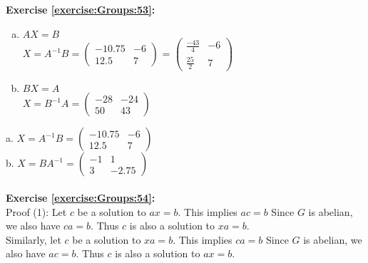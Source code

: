 \noindent\textbf{Exercise \ref{exercise:Groups:53}:}
%
\begin{enumerate}[(a)]
\item
$AX=B$\\
$X=A^{-1}B=\begin{pmatrix}
-10.75 & -6\\
12.5 & 7
\end{pmatrix}$ = $\begin{pmatrix}
\frac{-43}{4} & -6\\
\frac{25}{2} & 7
\end{pmatrix}$\\


\item
$BX=A$\\
$X=B^{-1}A=\begin{pmatrix}
-28 & -24\\
50 & 43
\end{pmatrix}$\\
\end{enumerate}
a. $X=A^{-1}B=\begin{pmatrix}
-10.75 & -6\\
12.5 & 7
\end{pmatrix}$\\
b. $X=BA^{-1}=\begin{pmatrix}
-1 & 1\\
3 & -2.75
\end{pmatrix}$\\
\\

\noindent\textbf{Exercise \ref{exercise:Groups:54}:}
\\
\noindent Proof (1):
Let $c$ be a solution to $ax=b$.  This implies $ac=b$ Since $G$ is abelian, we also have $ca=b$. Thus $c$ is also a solution to $xa=b$.\\
Similarly, let $c$ be a solution to $xa=b$.  This implies $ca=b$ Since $G$ is abelian, we also have $ac=b$. Thus $c$ is also a solution to $ax=b$.\\

